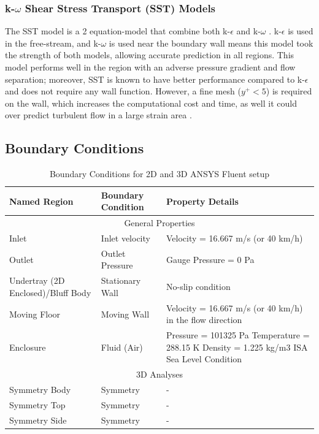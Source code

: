 \subsubsection{k-$\omega$ Shear Stress Transport (SST) Models}
The SST model is a 2 equation-model that combine both k-$\epsilon$ and k-$\omega$ \cite{Andersson2011Turbulent-flowModelling}\cite{Ansys2006ModelingFlows}.  k-$\epsilon$ is used in the free-stream, and k-$\omega$ is used near the boundary wall means this model took the strength of both models, allowing accurate prediction in all regions. This model performs well in the region with an adverse pressure gradient and flow separation; moreover, SST is known to have better performance compared to k-$\epsilon$ and does not require any wall function\cite{Andersson2011Turbulent-flowModelling}. However, a fine mesh ($y^+  < 5$) is required on the wall, which increases the computational cost and time, as well it could over predict turbulent flow in a large strain area \cite{Andersson2011Turbulent-flowModelling}\cite{Ansys2006ModelingFlows}. 

\subsection{Boundary Conditions}
\begin{table}[!htb]
\centering
    \caption{Boundary Conditions for 2D and 3D ANSYS Fluent setup}
    \label{tab:Boundary Conditions}
\begin{tabular}{||p{3cm}|p{3cm}|p{6cm}||}
 \hline
 \centering
 Named Region  &  Boundary Condition  & Property Details\\
 \hline \hline
 \multicolumn{3}{||c||}{General Properties} \\
 \hline
 
 Inlet & Inlet velocity & Velocity = 16.667 m/s (or 40 km/h)\\
 \hline
 Outlet & Outlet Pressure  & Gauge Pressure = 0 Pa  \\
 \hline
 Undertray (2D Enclosed)/Bluff Body & Stationary Wall & No-slip condition\\
 \hline
 Moving Floor & Moving Wall & Velocity = 16.667 m/s (or 40 km/h) in the flow direction\\
 \hline
 Enclosure &   Fluid (Air)  & Pressure = 101325 Pa
Temperature = 288.15 K
Density = 1.225 kg/m3
ISA Sea Level Condition\\
 
 \hline
 \multicolumn{3}{||c||}{3D Analyses} \\
 \hline
 
 Symmetry Body & Symmetry  & -\\
 \hline
 Symmetry Top & Symmetry  & -\\
 \hline
 Symmetry Side & Symmetry & -\\
 \hline
 
\end{tabular}
\end{table}

